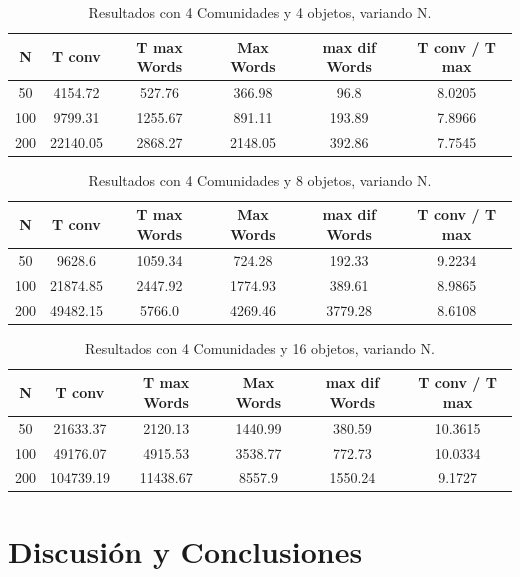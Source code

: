 \documentclass[runningheads]{llncs}
\begin{document}
\begin{table}[H]
	\centering
	\caption{Resultados con 4 Comunidades y 4 objetos, variando N.}\label{tab1}
	\begin{tabular}{|c|c|c|c|c|c|}
		\hline
		N &  T conv & T max Words & Max Words & max dif Words & T conv / T max  \\
		\hline
		50 & 4154.72 &   527.76 & 366.98 & 96.8 & 8.0205 \\
		\hline
		100 & 9799.31 &   1255.67 & 891.11 & 193.89 & 7.8966\\
		\hline
		200 & 22140.05 &  2868.27 & 2148.05 & 392.86 & 7.7545 \\
		\hline
	\end{tabular}
	\label{table:res4}
\end{table}

\begin{table}[H]
	\centering
	\caption{Resultados con 4 Comunidades y 8 objetos, variando N.}\label{tab1}
	\begin{tabular}{|c|c|c|c|c|c|}
		\hline
		N &  T conv & T max Words & Max Words & max dif Words & T conv / T max  \\
		\hline
		50 & 9628.6
		&   1059.34 & 724.28 & 192.33 & 9.2234 \\
		\hline
		100 & 21874.85
		&   2447.92
		& 1774.93 & 389.61 & 8.9865\\
		\hline
		200 & 49482.15 &  5766.0 & 4269.46
		& 3779.28
		& 8.6108 \\
		\hline
	\end{tabular}
	\label{table:res5}
\end{table}

\begin{table}[H]
	\centering
	\caption{Resultados con 4 Comunidades y 16 objetos, variando N.}\label{tab1}
	\begin{tabular}{|c|c|c|c|c|c|}
		\hline
		N &  T conv & T max Words & Max Words & max dif Words & T conv / T max  \\
		\hline
		50 & 21633.37
		&   2120.13 & 1440.99 & 380.59 & 10.3615
		\\
		\hline
		100 & 49176.07
		&   4915.53
		& 3538.77 & 772.73 & 10.0334		\\
		\hline
		200 & 104739.19
		&  11438.67 & 8557.9
		& 1550.24
		& 9.1727 \\
		\hline
	\end{tabular}
	\label{table:res6}
\end{table}

\section{Discusión y Conclusiones}
\end{document}
